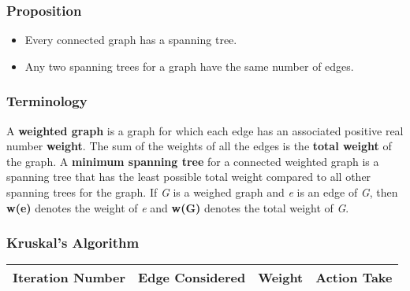 \documentclass{article}
\begin{document}
\subsubsection{Proposition}
\begin{itemize}
\item Every connected graph has a spanning tree.
\item Any two spanning trees for a graph have the same number of edges.
\end{itemize}

\subsubsection{Terminology}
A \textbf{weighted graph} is a graph for which each edge has an associated positive real number \textbf{weight}. The sum of the weights of all the edges is the \textbf{total weight} of the graph. A \textbf{minimum spanning tree} for a connected weighted graph is a spanning tree that has the least possible total weight compared to all other spanning trees for the graph.
If \textit{G} is a weighed graph and \textit{e} is an edge of \textit{G}, then \textbf{w(e)} denotes the weight of \textit{e} and \textbf{w(G)} denotes the total weight of \textit{G}.

\subsubsection{Kruskal’s Algorithm}
\begin{tabular}{ |c|c|c|c| }
\hline
Iteration Number & Edge Considered & Weight & Action Take  \\
\hline
\end{tabular}
\end{document}

